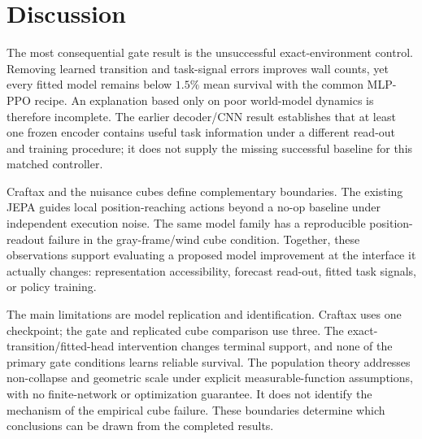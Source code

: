 \section{Discussion}
\label{sec:limitations}

The most consequential gate result is the unsuccessful exact-environment control. Removing learned
transition and task-signal errors improves wall counts, yet every fitted model remains below $1.5\%$
mean survival with the common MLP-PPO recipe. An explanation based only on poor world-model dynamics
is therefore incomplete. The earlier decoder/CNN result establishes that at least one frozen encoder
contains useful task information under a different read-out and training procedure; it does not
supply the missing successful baseline for this matched controller.

Craftax and the nuisance cubes define complementary boundaries. The existing JEPA guides local
position-reaching actions beyond a no-op baseline under independent execution noise. The same model
family has a reproducible position-readout failure in the gray-frame/wind cube condition. Together,
these observations support evaluating a proposed model improvement at the interface it actually
changes: representation accessibility, forecast read-out, fitted task signals, or policy training.

The main limitations are model replication and identification. Craftax uses one checkpoint; the
gate and replicated cube comparison use three. The exact-transition/fitted-head intervention changes
terminal support, and none of the primary gate conditions learns reliable survival. The population
theory addresses non-collapse and geometric scale under explicit measurable-function assumptions,
with no finite-network or optimization guarantee. It does not identify the mechanism of the empirical
cube failure. These boundaries determine which conclusions can be drawn from the completed results.
